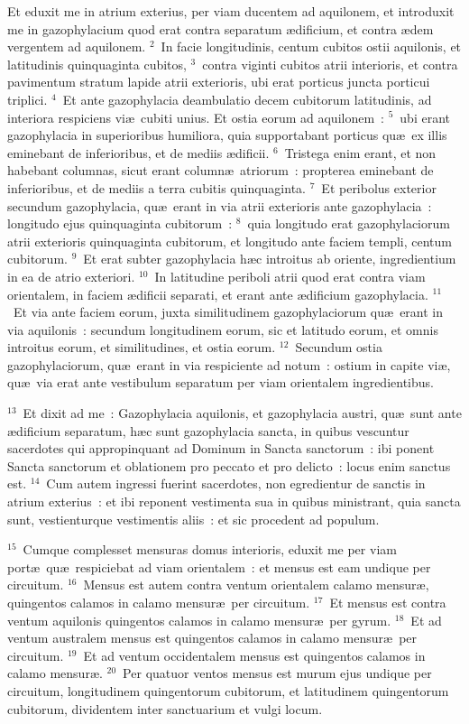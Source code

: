 \lettrine[lines=10,image=true,loversize=0.05,lraise=-0.03]{E}{}t eduxit me in atrium exterius, per viam ducentem ad aquilonem, et introduxit me in gazophylacium quod erat contra separatum \ae dificium, et contra \ae dem vergentem ad aquilonem.
${}^{2}$~In facie longitudinis, centum cubitos ostii aquilonis, et latitudinis quinquaginta cubitos,
${}^{3}$~contra viginti cubitos atrii interioris, et contra pavimentum stratum lapide atrii exterioris, ubi erat porticus juncta porticui triplici.
${}^{4}$~Et ante gazophylacia deambulatio decem cubitorum latitudinis, ad interiora respiciens vi\ae\ cubiti unius. Et ostia eorum ad aquilonem~:
${}^{5}$~ubi erant gazophylacia in superioribus humiliora, quia supportabant porticus qu\ae\ ex illis eminebant de inferioribus, et de mediis \ae dificii.
${}^{6}$~Tristega enim erant, et non habebant columnas, sicut erant column\ae\ atriorum~: propterea eminebant de inferioribus, et de mediis a terra cubitis quinquaginta.
${}^{7}$~Et peribolus exterior secundum gazophylacia, qu\ae\ erant in via atrii exterioris ante gazophylacia~: longitudo ejus quinquaginta cubitorum~:
${}^{8}$~quia longitudo erat gazophylaciorum atrii exterioris quinquaginta cubitorum, et longitudo ante faciem templi, centum cubitorum.
${}^{9}$~Et erat subter gazophylacia h\ae c introitus ab oriente, ingredientium in ea de atrio exteriori.
${}^{10}$~In latitudine periboli atrii quod erat contra viam orientalem, in faciem \ae dificii separati, et erant ante \ae dificium gazophylacia.
${}^{11}$~Et via ante faciem eorum, juxta similitudinem gazophylaciorum qu\ae\ erant in via aquilonis~: secundum longitudinem eorum, sic et latitudo eorum, et omnis introitus eorum, et similitudines, et ostia eorum.
${}^{12}$~Secundum ostia gazophylaciorum, qu\ae\ erant in via respiciente ad notum~: ostium in capite vi\ae , qu\ae\ via erat ante vestibulum separatum per viam orientalem ingredientibus.


${}^{13}$~Et dixit ad me~: Gazophylacia aquilonis, et gazophylacia austri, qu\ae\ sunt ante \ae dificium separatum, h\ae c sunt gazophylacia sancta, in quibus vescuntur sacerdotes qui appropinquant ad Dominum in Sancta sanctorum~: ibi ponent Sancta sanctorum et oblationem pro peccato et pro delicto~: locus enim sanctus est.
${}^{14}$~Cum autem ingressi fuerint sacerdotes, non egredientur de sanctis in atrium exterius~: et ibi reponent vestimenta sua in quibus ministrant, quia sancta sunt, vestienturque vestimentis aliis~: et sic procedent ad populum.


${}^{15}$~Cumque complesset mensuras domus interioris, eduxit me per viam port\ae\ qu\ae\ respiciebat ad viam orientalem~: et mensus est eam undique per circuitum.
${}^{16}$~Mensus est autem contra ventum orientalem calamo mensur\ae , quingentos calamos in calamo mensur\ae\ per circuitum.
${}^{17}$~Et mensus est contra ventum aquilonis quingentos calamos in calamo mensur\ae\ per gyrum.
${}^{18}$~Et ad ventum australem mensus est quingentos calamos in calamo mensur\ae\ per circuitum.
${}^{19}$~Et ad ventum occidentalem mensus est quingentos calamos in calamo mensur\ae .
${}^{20}$~Per quatuor ventos mensus est murum ejus undique per circuitum, longitudinem quingentorum cubitorum, et latitudinem quingentorum cubitorum, dividentem inter sanctuarium et vulgi locum.

